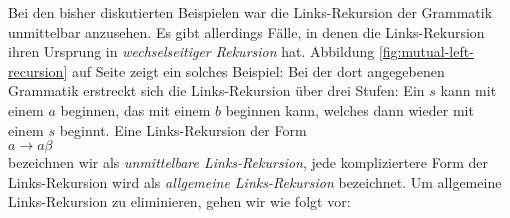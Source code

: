 Bei den bisher diskutierten Beispielen war die Links-Rekursion der Grammatik unmittelbar anzusehen.
Es gibt allerdings F\"alle, in denen die Links-Rekursion ihren Ursprung in 
\emph{wechselseitiger Rekursion} hat.
Abbildung \ref{fig:mutual-left-recursion} auf Seite \pageref{fig:mutual-left-recursion} zeigt ein
solches Beispiel: Bei der dort angegebenen Grammatik erstreckt sich die Links-Rekursion \"uber drei Stufen:
Ein $s$ kann mit einem $a$ beginnen, das mit einem $b$ beginnen kann, welches dann wieder mit einem
$s$ beginnt.  Eine Links-Rekursion der Form
\\[0.2cm]
\hspace*{1.3cm}
$a \rightarrow a \beta$
\\[0.2cm]
bezeichnen wir als \emph{unmittelbare Links-Rekursion},  jede kompliziertere Form der
Links-Rekursion wird als \emph{allgemeine Links-Rekursion} bezeichnet.
Um allgemeine Links-Rekursion zu eliminieren, gehen wir wie folgt vor:
